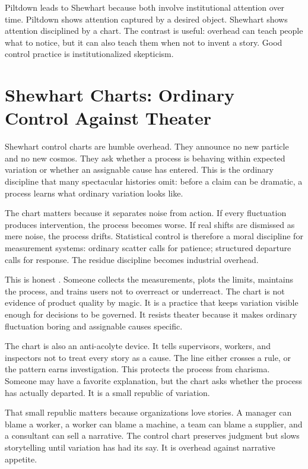 Piltdown leads to Shewhart because both involve institutional attention over
time. Piltdown shows attention captured by a desired object. Shewhart shows
attention disciplined by a chart. The contrast is useful:
overhead can teach people what to notice, but it can also teach them when not
to invent a story. Good control practice is institutionalized skepticism.

\section{Shewhart Charts: Ordinary Control Against Theater}

Shewhart control charts are humble overhead. They announce no new particle
and no new cosmos. They ask whether a process is behaving within expected
variation or whether an assignable cause has entered. This is the ordinary
discipline that many spectacular histories omit: before a claim can be
dramatic, a process learns what ordinary variation looks like.

The chart matters because it separates noise from action. If every fluctuation
produces intervention, the process becomes worse. If real shifts are dismissed
as mere noise, the process drifts. Statistical control is therefore a moral
discipline for measurement systems: ordinary scatter calls for patience;
structured departure calls for response. The residue discipline becomes
industrial overhead.

This is honest . Someone collects the measurements, plots the
limits, maintains the process, and trains users not to overreact or
underreact.
The chart is not evidence of product quality by magic. It is a practice that
keeps variation visible enough for decisions to be governed. It resists
theater because it makes ordinary fluctuation boring and assignable causes
specific.

The chart is also an anti-acolyte device. It tells supervisors, workers, and
inspectors not to treat every story as a cause. The line either crosses a
rule, or the pattern earns investigation. This protects the process from charisma.
Someone may have a favorite explanation, but the chart asks whether the
process has actually departed. It is a small republic of variation.

That small republic matters because organizations love stories. A manager can
blame a worker, a worker can blame a machine, a team can blame a supplier, and
a consultant can sell a narrative. The control chart preserves judgment but
slows storytelling until variation has had its say. It is overhead
against narrative appetite.

